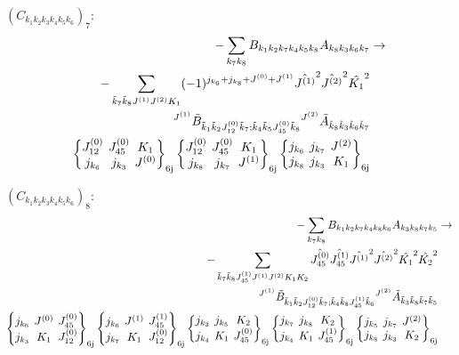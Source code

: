 \documentclass[11pt]{article}
\newcommand{\sixj}[6]{\begingroup\setlength{\arraycolsep}{0.2em}\begin{Bmatrix} #1 & #2 & #3 \\ #4 & #5 & #6 \end{Bmatrix}_{\text{6j}}\endgroup}
\begin{document}
$\left({C}_{{k}_{1}{k}_{2}{k}_{3}{k}_{4}{k}_{5}{k}_{6}}\right)_{7}$:
\begin{align}
-\sum_{{k}_{7}{k}_{8}}{B}_{{k}_{1}{k}_{2}{k}_{7}{k}_{4}{k}_{5}{k}_{8}}{A}_{{k}_{8}{k}_{3}{k}_{6}{k}_{7}}&\rightarrow \notag \\-\sum_{\tilde{k}_{7}\tilde{k}_{8}J^{(1)}J^{(2)}K_{1}}(-1)^{j_{{k}_{6}} +j_{{k}_{8}} +J^{(0)} +J^{(1)} }\hat{J^{(1)}}^{2}\hat{J^{(2)}}^{2}\hat{K_{1}}^{2}& \notag \\{}^{J^{(1)}}\tilde{B}_{\tilde{k}_{1}\tilde{k}_{2}J^{(0)}_{12}\tilde{k}_{7};\tilde{k}_{4}\tilde{k}_{5}J^{(0)}_{45}\tilde{k}_{8}}{}^{J^{(2)}}\tilde{A}_{\tilde{k}_{8}\tilde{k}_{3}\tilde{k}_{6}\tilde{k}_{7}}& \notag \\\sixj{J^{(0)}_{12}}{J^{(0)}_{45}}{K_{1}}{j_{{k}_{6}}}{j_{{k}_{3}}}{J^{(0)}}\sixj{J^{(0)}_{12}}{J^{(0)}_{45}}{K_{1}}{j_{{k}_{8}}}{j_{{k}_{7}}}{J^{(1)}}\sixj{j_{{k}_{6}}}{j_{{k}_{7}}}{J^{(2)}}{j_{{k}_{8}}}{j_{{k}_{3}}}{K_{1}}
\end{align}

$\left({C}_{{k}_{1}{k}_{2}{k}_{3}{k}_{4}{k}_{5}{k}_{6}}\right)_{8}$:
\begin{align}
-\sum_{{k}_{7}{k}_{8}}{B}_{{k}_{1}{k}_{2}{k}_{7}{k}_{4}{k}_{8}{k}_{6}}{A}_{{k}_{3}{k}_{8}{k}_{7}{k}_{5}}&\rightarrow \notag \\-\sum_{\tilde{k}_{7}\tilde{k}_{8}J^{(1)}_{45}J^{(1)}J^{(2)}K_{1}K_{2}}\hat{J^{(0)}_{45}}\hat{J^{(1)}_{45}}\hat{J^{(1)}}^{2}\hat{J^{(2)}}^{2}\hat{K_{1}}^{2}\hat{K_{2}}^{2}& \notag \\{}^{J^{(1)}}\tilde{B}_{\tilde{k}_{1}\tilde{k}_{2}J^{(0)}_{12}\tilde{k}_{7};\tilde{k}_{4}\tilde{k}_{8}J^{(1)}_{45}\tilde{k}_{6}}{}^{J^{(2)}}\tilde{A}_{\tilde{k}_{3}\tilde{k}_{8}\tilde{k}_{7}\tilde{k}_{5}}& \notag \\\sixj{j_{{k}_{6}}}{J^{(0)}}{J^{(0)}_{45}}{j_{{k}_{3}}}{K_{1}}{J^{(0)}_{12}}\sixj{j_{{k}_{6}}}{J^{(1)}}{J^{(1)}_{45}}{j_{{k}_{7}}}{K_{1}}{J^{(0)}_{12}}\sixj{j_{{k}_{3}}}{j_{{k}_{5}}}{K_{2}}{j_{{k}_{4}}}{K_{1}}{J^{(0)}_{45}}\sixj{j_{{k}_{7}}}{j_{{k}_{8}}}{K_{2}}{j_{{k}_{4}}}{K_{1}}{J^{(1)}_{45}}\sixj{j_{{k}_{5}}}{j_{{k}_{7}}}{J^{(2)}}{j_{{k}_{8}}}{j_{{k}_{3}}}{K_{2}}
\end{align}
\end{document}
